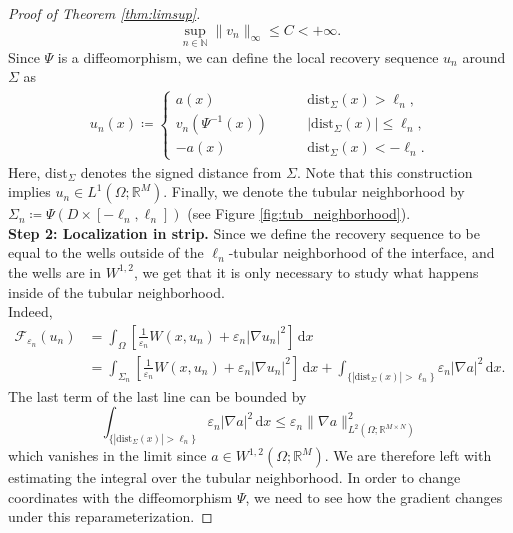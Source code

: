 \documentclass[a4paper, 11pt, reqno]{amsart}
\theoremstyle{plain}
\theoremstyle{definition}
\theoremstyle{remark}
\newcommand{\N}{\mathbb N}
\newcommand{\R}{\mathbb R}
\newcommand{\dd}{\,\mathrm{d}}
\begin{document}
\begin{proof}[Proof of Theorem \ref{thm:limsup}]
\begin{equation}\label{eq:vn_bounded}
    \sup_{n \in \N} \| v_n \|_\infty \leq C < + \infty.
\end{equation}
Since $\Psi$ is a diffeomorphism, we can define the local recovery sequence $u_n$ around $\Sigma$ as
\begin{gather}\label{eq:recovery_sequence}
    u_n(x) \coloneqq \begin{cases}
        a(x) &\qquad \mathrm{dist}_\Sigma(x) > \ell_n,\\
        v_n(\Psi^{-1}(x)) &\qquad |\mathrm{dist}_\Sigma(x)| \leq \ell_n,\\
        -a(x) &\qquad \mathrm{dist}_\Sigma(x) < - \ell_n.
    \end{cases}
\end{gather}
Here, $\mathrm{dist}_\Sigma$ denotes the signed distance from $\Sigma$.
Note that this construction implies $u_n \in L^1(\Omega; \R^M)$.
Finally, we denote the tubular neighborhood by $\Sigma_n \coloneqq \Psi(D \times [-\ell_n, \ell_n])$ (see Figure \ref{fig:tub_neighborhood}).\\[0.5em]
\textbf{Step 2: Localization in strip.}
Since we define the recovery sequence to be equal to the wells outside of the $\ell_n$-tubular neighborhood of the interface, and the wells are in $W^{1,2}$, we get that it is only necessary to study what happens inside of the tubular neighborhood.\\
Indeed,
\begin{align*}
    \mathcal{F}_{\varepsilon_n}(u_n) &= \int_\Omega \left[ \frac{1}{\varepsilon_n} W(x, u_n) + \varepsilon_n | \nabla u_n|^2 \right] \dd x \\
    &= \int_{\Sigma_n} \left[ \frac{1}{\varepsilon_n} W(x, u_n) + \varepsilon_n | \nabla u_n|^2 \right] \dd x + \int_{\{ |\mathrm{dist}_\Sigma(x)| > \ell_n \}}  \varepsilon_n |\nabla a|^2 \dd x.
\end{align*}
The last term of the last line can be bounded by
$$ \int_{\{ |\mathrm{dist}_\Sigma(x)| > \ell_n \}}  \varepsilon_n |\nabla a|^2 \dd x \leq \varepsilon_n \| \nabla a \|^2_{L^2(\Omega; \R^{M \times N})} $$
which vanishes in the limit since $a \in W^{1,2}(\Omega; \R^M)$. We are therefore left with estimating the integral over the tubular neighborhood.
In order to change coordinates with the diffeomorphism $\Psi$, we need to see how the gradient changes under this reparameterization. 


\end{proof}
\end{document}
